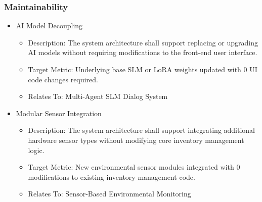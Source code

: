 \documentclass[conference]{IEEEtran}
\begin{document}
\subsubsection{Maintainability}
\begin{itemize}
    \item AI Model Decoupling
    \begin{itemize}
        \item Description: The system architecture shall support replacing or upgrading AI models without requiring modifications to the front-end user interface.
        \item Target Metric: Underlying base SLM or LoRA weights updated with 0 UI code changes required.
        \item Relates To: Multi-Agent SLM Dialog System
    \end{itemize}

    \item Modular Sensor Integration
    \begin{itemize}
        \item Description: The system architecture shall support integrating additional hardware sensor types without modifying core inventory management logic.
        \item Target Metric: New environmental sensor modules integrated with 0 modifications to existing inventory management code.
        \item Relates To: Sensor-Based Environmental Monitoring
    \end{itemize}
\end{itemize}
\end{document}
